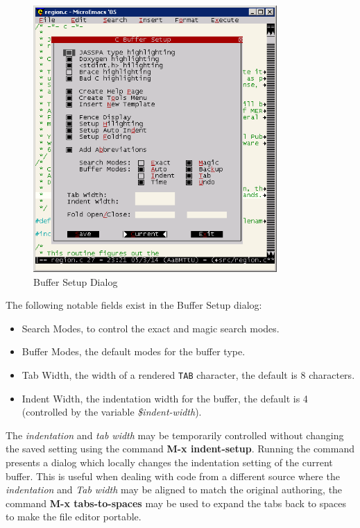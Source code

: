 \documentclass[11pt,a4paper,pdftex]{article}
\begin{document}
\begin{figure}[!hbt]
  \begin{center}
    \includegraphics[keepaspectratio,height=4in]{buffersetup}
    \caption{Buffer Setup Dialog}
    \label{fig:buffersetup}
  \end{center}
\end{figure}
  
  The following notable fields exist in the Buffer Setup dialog:
  
  \begin{itemize}
    \item Search Modes, to control the exact and magic search modes.
    \item Buffer Modes, the default modes for the buffer type.
    \item Tab Width, the width of a rendered \texttt{TAB} character, the 
    default is 8 characters.
    \item Indent Width, the indentation width for the buffer, the default is 4 
    (controlled by the variable \textit{\$indent-width}).
  \end{itemize}
  
  The \textit{indentation} and \textit{tab width} may be temporarily
  controlled without changing the saved setting using the command \textbf{M-x
  indent-setup}. Running the command presents a dialog which locally changes
  the indentation setting of the current buffer. This is useful when dealing
  with code from a different source where the \textit{indentation} and
  \textit{Tab width} may be aligned to match the original authoring, the
  command \textbf{M-x tabs-to-spaces} may be used to expand the tabs back to
  spaces to make the file editor portable.
\end{document}
